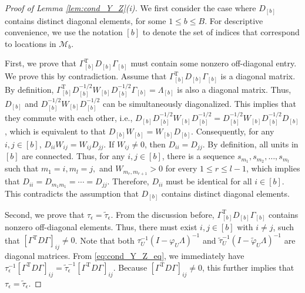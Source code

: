 \documentclass[11pt]{article}
\theoremstyle{definition}
\theoremstyle{remark}
\def\top{{ \mathrm{\scriptscriptstyle T} }}
\begin{document}
\begin{proof}[Proof of Lemma \ref{lem:cond_Y_Z}(i)]
We first consider the case where $D_{[b]}$ contains distinct diagonal elements, for some $1\le b\le B$. 
For descriptive convenience, 
we use the notation $[b]$ to denote the set of indices that correspond to locations in $\mathcal{M}_b$. 

First, we prove that $\Gamma_{[b]}^\top D_{[b]} \Gamma_{[b]}$ must contain some nonzero off-diagonal entry.
We prove this by contradiction. 
Assume that $\Gamma_{[b]}^\top D_{[b]} \Gamma_{[b]}$ is a diagonal matrix. By definition, $\Gamma_{[b]}^\top D_{[b]}^{-1/2} W_{[b]} D_{[b]}^{-1/2} \Gamma_{[b]} =  \Lambda_{[b]}$ is also a diagonal matrix. 
Thus, $D_{[b]}$ and $D_{[b]}^{-1/2} W_{[b]} D_{[b]}^{-1/2}$ can be 
simultaneously diagonalized. 
This implies that they commute with each other, i.e., 
$D_{[b]} D_{[b]}^{-1/2} W_{[b]} D_{[b]}^{-1/2} = D_{[b]}^{-1/2} W_{[b]} D_{[b]}^{-1/2} D_{[b]}$, which is  equivalent to that $D_{[b]} W_{[b]} = W_{[b]} D_{[b]}$. 
Consequently, for any $i, j \in [b]$, 
$D_{ii}W_{ij} = W_{ij} D_{jj}$. 
If $W_{ij}\ne 0$, then $D_{ii}=D_{jj}$. 
By definition, all units in $[b]$ are connected. Thus, for any $i,j\in [b]$, there is a sequence $s_{m_1},s_{m_2},\ldots,s_{m_l}$ such that $m_1 = i, m_l = j,$ and  $W_{m_r,m_{r+1}}>0$ for every $1\le r \le l-1$, which implies that $D_{ii}= D_{m_1 m_1} = \cdots = D_{jj}$. Therefore, $D_{ii}$ must be identical for all $i\in [b]$. 
This contradicts the assumption that $D_{[b]}$ contains distinct diagonal elements. 

Second, we prove that $\tau_{\epsilon} = \tilde{\tau}_{\epsilon}$. 
From the discussion before, 
$\Gamma_{[b]}^\top D_{[b]} \Gamma_{[b]}$ contains nonzero off-diagonal elements. 
Thus, there must exist $i, j \in [b]$ with $i\ne j$, such that $[\Gamma^\top D \Gamma]_{ij} \ne 0$.
Note that 
both $\tau_U^{-1} (I-\varphi_U \Lambda)^{-1}$ and $\tilde{\tau}_U^{-1} (I-\tilde{\varphi}_U \Lambda)^{-1}$ are diagonal matrices. 
From \eqref{eq:cond_Y_Z_eq}, we immediately have 
$\tau_{\epsilon}^{-1} [\Gamma^\top D \Gamma]_{ij} = \tilde{\tau}_{\epsilon}^{-1} [\Gamma^\top D \Gamma]_{ij}$. 
Because $[\Gamma^\top D \Gamma]_{ij} \ne 0$, this further implies that $\tau_{\epsilon} = \tilde{\tau}_{\epsilon}$. 



\end{proof}
\end{document}
